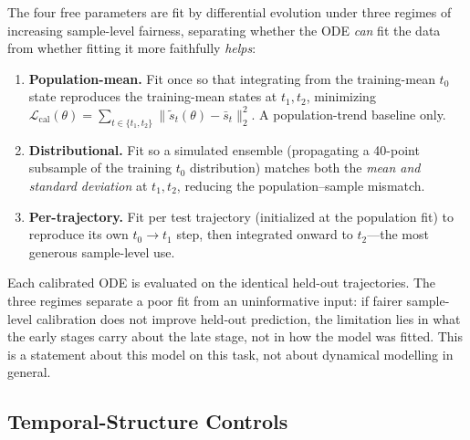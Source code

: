 \documentclass[pdflatex,sn-mathphys-num]{sn-jnl}
\theoremstyle{thmstyleone}%
\theoremstyle{thmstyletwo}%
\theoremstyle{thmstylethree}%
\begin{document}
The four free parameters are fit by differential evolution under three regimes of increasing sample-level fairness, separating whether the ODE \emph{can} fit the data from whether fitting it more faithfully \emph{helps}:
\begin{enumerate}
    \item \textbf{Population-mean.} Fit once so that integrating from the training-mean $t_0$ state reproduces the training-mean states at $t_1,t_2$, minimizing $\mathcal{L}_{\mathrm{cal}}(\theta)=\sum_{t\in\{t_1,t_2\}}\lVert\tilde{s}_t(\theta)-\bar{s}_t\rVert_2^2$. A population-trend baseline only.
    \item \textbf{Distributional.} Fit so a simulated ensemble (propagating a 40-point subsample of the training $t_0$ distribution) matches both the \emph{mean and standard deviation} at $t_1,t_2$, reducing the population--sample mismatch.
    \item \textbf{Per-trajectory.} Fit per test trajectory (initialized at the population fit) to reproduce its own $t_0\!\rightarrow\!t_1$ step, then integrated onward to $t_2$---the most generous sample-level use.
\end{enumerate}
Each calibrated ODE is evaluated on the identical held-out trajectories. The three regimes separate a poor fit from an uninformative input: if fairer sample-level calibration does not improve held-out prediction, the limitation lies in what the early stages carry about the late stage, not in how the model was fitted. This is a statement about this model on this task, not about dynamical modelling in general.

\subsection{\textbf{Temporal-Structure Controls}}
\label{subsec:controls}
\end{document}
